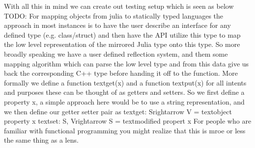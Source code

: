 {}\markdownRendererInterblockSeparator
{}With all this in mind we can create out testing setup which is seen as below\markdownRendererInterblockSeparator
{}\markdownRendererInterblockSeparator
{}\markdownRendererInterblockSeparator
{}TODO: \markdownRendererInterblockSeparator
{}\markdownRendererInterblockSeparator
{}For mapping objects from julia to statically typed languages the approach in most instances is to have the user describe an interface for any defined type (e.g. class/struct) and then have the API utilize this type to map the low level representation of the mirrored Julia type onto this type.\markdownRendererInterblockSeparator
{}So more broadly speaking we have a user defined reflection system, and them some mapping algorithm which can parse the low level type and from this data give us back the corresponding C++ type before handing it off to the function.\markdownRendererInterblockSeparator
{}More formally we define a function \markdownRendererDollarSign{}\markdownRendererBackslash{}text\markdownRendererLeftBrace{}get\markdownRendererRightBrace{}(x)\markdownRendererDollarSign{} and a function \markdownRendererDollarSign{}\markdownRendererBackslash{}text\markdownRendererLeftBrace{}put\markdownRendererRightBrace{}(x)\markdownRendererDollarSign{} for all intents and purposes these can be thought of as getters and setters. So we first define a property \markdownRendererDollarSign{}x\markdownRendererDollarSign{}, a simple approach here would be to use a string representation, and we then define our getter setter pair as \markdownRendererDollarSign{}\markdownRendererDollarSign{} \markdownRendererBackslash{}text\markdownRendererLeftBrace{}get\markdownRendererRightBrace{}: S\markdownRendererBackslash{}rightarrow V = \markdownRendererBackslash{}text\markdownRendererLeftBrace{}object property \markdownRendererRightBrace{}x \markdownRendererDollarSign{}\markdownRendererDollarSign{} \markdownRendererDollarSign{}\markdownRendererDollarSign{} \markdownRendererBackslash{}text\markdownRendererLeftBrace{}set\markdownRendererRightBrace{}: S, V\markdownRendererBackslash{}rightarrow S = \markdownRendererBackslash{}text\markdownRendererLeftBrace{}modified propert \markdownRendererRightBrace{}x \markdownRendererDollarSign{}\markdownRendererDollarSign{} For people who are familiar with functional programming you might realize that this is mroe or less the same thing as a lens.\markdownRendererInterblockSeparator
